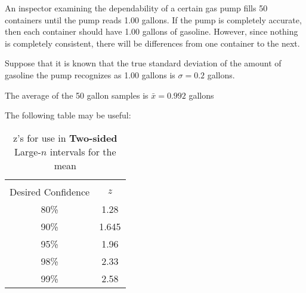 \documentclass[addpoints]{examsetup}
\begin{document}
\begin{questions}
\question

An inspector examining the dependability of a certain gas pump fills 50 containers until the pump reads 1.00 gallons. 
If the pump is completely accurate, then each container should have 1.00 gallons of gasoline.
However, since nothing is completely consistent, there will be differences from one container to the next.

Suppose that it is known that the true standard deviation of the amount of gasoline the pump recognizes as 1.00 gallons is $\sigma = 0.2$ gallons.

The average of the 50 gallon samples is $\bar{x} = 0.992$ gallons

The following table may be useful:

\begin{table}[h]
   \centering
   \caption{z's for use in \textbf{Two-sided} Large-$n$ intervals for the mean}
   \begin{tabular}{cc}
      \hline \\
      Desired Confidence & $z$ \\
      \hline 
      80\% & 1.28 \\
      90\% & 1.645 \\
      95\% & 1.96 \\
      98\% & 2.33 \\
      99\% & 2.58 \\
      \hline 
   \end{tabular}
\end{table}

\end{questions}
\end{document}
